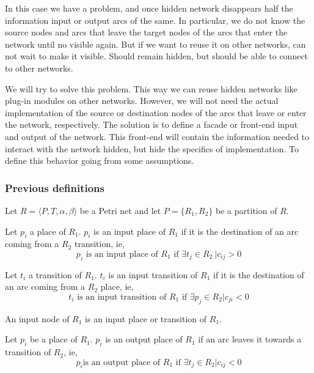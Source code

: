 {In this case we have a problem, and once hidden network disappears half the information input or output arcs of the same. In particular, we do not know the source nodes and arcs that leave the target nodes of the arcs that enter the network until no visible again. But if we want to reuse it on other networks, can not wait to make it visible. Should remain hidden, but should be able to connect to other networks.

We will try to solve this problem. This way we can reuse hidden networks like plug-in modules on other networks. However, we will not need the actual implementation of the source or destination nodes of the arcs that leave or enter the network, respectively. The solution is to define a facade or front-end input and output of the network. This front-end will contain the information needed to interact with the network hidden, but hide the specifics of implementation. To define this behavior going from some assumptions.

\subsubsection{Previous definitions}

Let $R=\langle P,T,\alpha,\beta\rangle$ be a Petri net and let $P=\{R_1,
R_2\}$ be a partition of $R$. 

\begin{definition}
Let $p_i$ a place of $R_1$. $p_i$ is an input place of $R_1$ if it is the
destination of an arc coming from a $R_2$ transition, ie,
\[
p_i \mbox{ is an input place of } R_1 \mbox{ if } \exists t_j \in R_2\ | c_{ij}>0
\]
\end{definition}

\begin{definition}
Let $t_i$ a transition of $R_1$. $t_i$ is an input transition of $R_1$ if it is the destination of an arc coming from a $R_2$ place, ie,
\[
t_i \mbox{ is an input transition of } R_1 \mbox{ if } \exists p_j \in R_2 | c_{ji}<
0
\]
\end{definition}

\begin{definition}
An input node of $R_1$ is an input place or transition of $R_1$.
\end{definition}

\begin{definition}
Let $p_i$ be a place of $R_1$. $p_i$ is an output place of $R_1$
if an arc leaves it towards a transition of $R_2$, ie,
\[
p_i \mbox{is an output place of } R_1 \mbox{ if } \exists t_j \in R_2 | c_{ij} < 0
\]
\end{definition}

}

